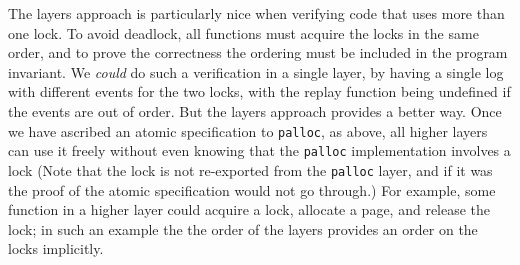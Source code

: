 The layers approach is particularly nice when verifying code that uses more than one
lock. To avoid deadlock, all functions must acquire the locks in the
same order, and to prove the correctness the ordering must be
included in the program invariant. We \emph{could} do such a
verification in a single layer, by having a single log with different
events for the two locks, with the replay function being undefined if
the events are out of order. But the layers approach provides a
better way. Once we have ascribed an atomic specification to
\lstinline$palloc$, as above, all higher layers can use it
freely without even knowing that the \lstinline$palloc$ implementation
involves a lock (Note that the lock is not re-exported from the
\lstinline$palloc$ layer, and if it was the proof of the atomic
specification would not go through.)  For example, some function in a
higher layer could acquire a lock, allocate a page, and release the
lock; in such an example the the order of the layers provides an order
on the locks implicitly.




